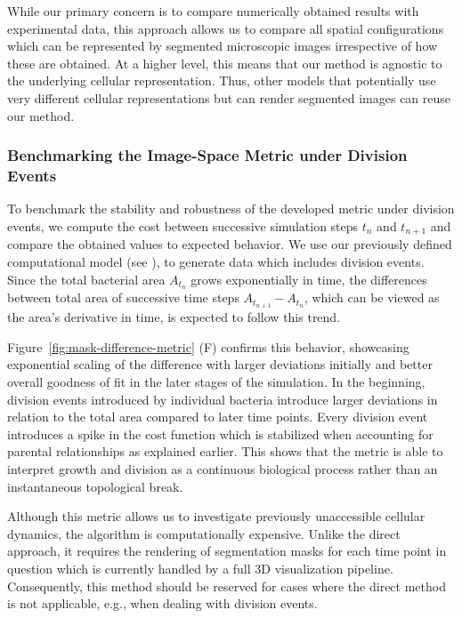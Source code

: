 While our primary concern is to compare numerically obtained results with experimental data,
this approach allows us to compare all spatial configurations which can be represented
by segmented microscopic images irrespective of how these are obtained.
At a higher level, this means that our method is agnostic to the underlying cellular representation.
Thus, other models that potentially use very different cellular representations but can render
segmented images can reuse our method.

\subsubsection{Benchmarking the Image-Space Metric under Division Events}
To benchmark the stability and robustness of the developed metric under division events, we compute
the cost between successive simulation steps $t_n$ and $t_{n+1}$ and compare the obtained values to
expected behavior.
We use our previously defined computational model (see ), to
generate data which includes division events.
Since the total bacterial area $A_{t_n}$ grows exponentially in time, the differences between total
area of successive time steps $A_{t_{n+1}}-A_{t_n}$, which can be viewed as the area's derivative in
time, is expected to follow this trend.

Figure~\ref{fig:mask-difference-metric} (F) confirms this behavior, showcasing exponential scaling
of the difference with larger deviations initially and better overall goodness of fit in the later
stages of the simulation.
In the beginning, division events introduced by individual bacteria introduce larger deviations in
relation to the total area compared to later time points.
Every division event introduces a spike in the cost function which is stabilized when accounting
for parental relationships as explained earlier.
This shows that the metric is able to interpret growth and division as a continuous biological
process rather than an instantaneous topological break.

Although this metric allows us to investigate previously unaccessible cellular dynamics, the
algorithm is computationally expensive.
Unlike the direct approach, it requires the rendering of segmentation masks for each time point in
question which is currently handled by a full 3D visualization pipeline.
Consequently, this method should be reserved for cases where the direct method is not applicable,
e.g., when dealing with division events.

